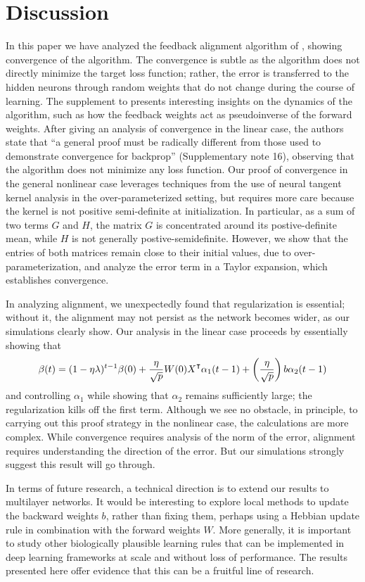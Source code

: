 \section{Discussion}

In this paper we have analyzed the feedback alignment algorithm of
\cite{lillicrap2016random}, showing convergence of the algorithm. The convergence is subtle as the algorithm does not directly minimize the target loss function; rather, the error is transferred to the hidden neurons through random weights that do not change during the course of learning.
The supplement to \cite{lillicrap2016random} presents interesting insights on the dynamics of the algorithm, such as how the feedback weights act as pseudoinverse of the forward weights. After giving an analysis of convergence in the linear case, the authors state that
``a general proof must be radically different from those used to demonstrate convergence for backprop'' (Supplementary note 16), observing that the algorithm does not minimize any loss function. Our proof of convergence in the general nonlinear case leverages techniques from
the use of neural tangent kernel analysis in the over-parameterized setting, but requires more care because the kernel is not positive semi-definite at initialization. In particular, as a sum of two terms $G$ and $H$, the matrix $G$ is concentrated around its postive-definite mean, while $H$ is not generally postive-semidefinite. However, we show that the entries of both matrices remain close to their initial values, due to over-parameterization, and analyze the error term in a Taylor expansion, which establishes convergence.

In analyzing alignment, we unexpectedly found that regularization is essential; without it, the alignment may not persist as the network becomes wider, as our simulations clearly show.
Our analysis in the linear case proceeds by essentially showing that
$$\beta(t) = (1-\eta \lambda)^{t-1} \beta(0) + \frac{\eta}{\sqrt{p}} W(0) X\transpose \alpha_1(t-1) +
\left(\frac{\eta}{\sqrt{p}} \right) b \alpha_2(t-1)$$
and controlling $\alpha_1$ while showing that $\alpha_2$ remains sufficiently large; the
regularization kills off the first term.
Although we see no obstacle, in principle, to carrying out this proof strategy in the nonlinear
case, the calculations are more complex. While convergence requires analysis of the norm of the error, alignment requires understanding the direction of the error. But our simulations strongly suggest this result will go through.

In terms of future research, a technical direction is to extend our results to multilayer networks. It would be interesting to explore local methods to update the backward weights $b$, rather than fixing them, perhaps using a Hebbian update rule in combination with the forward weights $W$. More generally, it is important to study other biologically plausible learning rules that can be implemented in deep learning frameworks at scale and without loss of performance.  The results presented here offer evidence that this can be a fruitful line of research.
